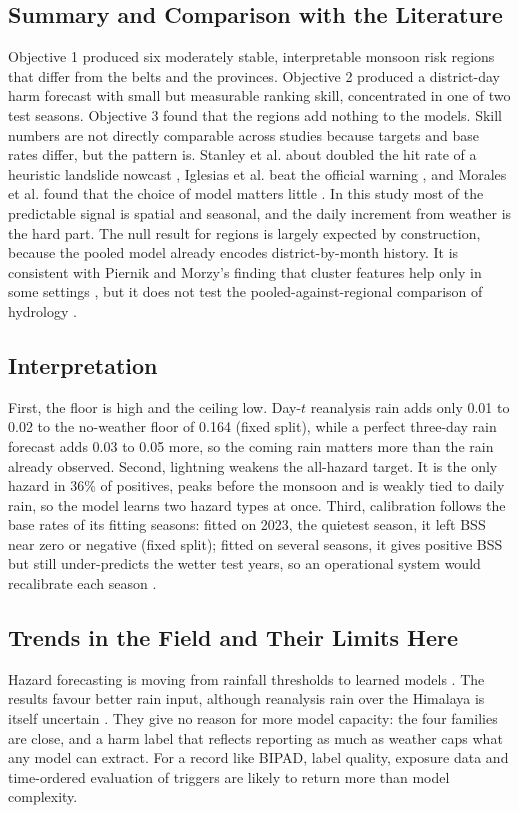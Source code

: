 \documentclass[conference]{IEEEtran}
\begin{document}
\subsection{Summary and Comparison with the Literature}
Objective 1 produced six moderately stable, interpretable monsoon risk regions that differ from the belts and the provinces. Objective 2 produced a district-day harm forecast with small but measurable ranking skill, concentrated in one of two test seasons. Objective 3 found that the regions add nothing to the models. Skill numbers are not directly comparable across studies because targets and base rates differ, but the pattern is. Stanley et al. about doubled the hit rate of a heuristic landslide nowcast \cite{Stanley2021}, Iglesias et al. beat the official warning \cite{Iglesias2024}, and Morales et al. found that the choice of model matters little \cite{Morales2026}. In this study most of the predictable signal is spatial and seasonal, and the daily increment from weather is the hard part. The null result for regions is largely expected by construction, because the pooled model already encodes district-by-month history. It is consistent with Piernik and Morzy's finding that cluster features help only in some settings \cite{Piernik2021}, but it does not test the pooled-against-regional comparison of hydrology \cite{Kratzert2019,Fang2022}.

\subsection{Interpretation}
First, the floor is high and the ceiling low. Day-$t$ reanalysis rain adds only 0.01 to 0.02 to the no-weather floor of 0.164 (fixed split), while a perfect three-day rain forecast adds 0.03 to 0.05 more, so the coming rain matters more than the rain already observed. Second, lightning weakens the all-hazard target. It is the only hazard in 36\% of positives, peaks before the monsoon and is weakly tied to daily rain, so the model learns two hazard types at once. Third, calibration follows the base rates of its fitting seasons: fitted on 2023, the quietest season, it left BSS near zero or negative (fixed split); fitted on several seasons, it gives positive BSS but still under-predicts the wetter test years, so an operational system would recalibrate each season \cite{Hamill2006}.

\subsection{Trends in the Field and Their Limits Here}
Hazard forecasting is moving from rainfall thresholds to learned models \cite{Stanley2021,Doerksen2023,Iglesias2024}. The results favour better rain input, although reanalysis rain over the Himalaya is itself uncertain \cite{Chen2021}. They give no reason for more model capacity: the four families are close, and a harm label that reflects reporting as much as weather \cite{Gall2009,Jones2022} caps what any model can extract. For a record like BIPAD, label quality, exposure data and time-ordered evaluation of triggers \cite{Kapoor2023,Potter2025} are likely to return more than model complexity.
\end{document}
